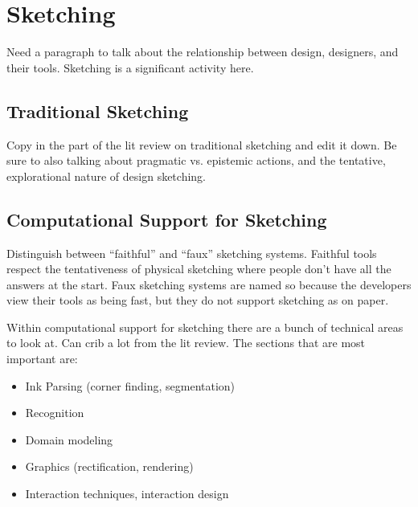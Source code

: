 \section{Sketching}

Need a paragraph to talk about the relationship between design,
designers, and their tools. Sketching is a significant activity
here. 

\subsection{Traditional Sketching}

Copy in the part of the lit review on traditional sketching and edit
it down. Be sure to also talking about pragmatic vs. epistemic
actions, and the tentative, explorational nature of design sketching.

\subsection{Computational Support for Sketching}

Distinguish between ``faithful'' and ``faux'' sketching
systems. Faithful tools respect the tentativeness of physical
sketching where people don't have all the answers at the start. Faux
sketching systems are named so because the developers view their tools
as being fast, but they do not support sketching as on paper.

Within computational support for sketching there are a bunch of
technical areas to look at. Can crib a lot from the lit review. The
sections that are most important are:

\begin{itemize}
\item Ink Parsing (corner finding, segmentation)
\item Recognition
\item Domain modeling
\item Graphics (rectification, rendering)
\item Interaction techniques, interaction design
\end{itemize}

